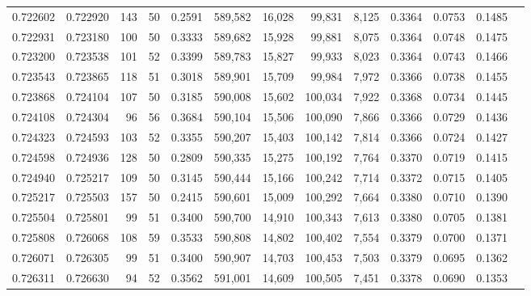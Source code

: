\begin{tabular}{rrrrrrrrrrrrr}
0.722602 & 0.722920 &   143 &  50 &                                     0.2591 & 589,582 &  16,028 &  99,831 &   8,125 & 0.3364 & 0.0753 & 0.1485 \\
0.722931 & 0.723180 &   100 &  50 &                                     0.3333 & 589,682 &  15,928 &  99,881 &   8,075 & 0.3364 & 0.0748 & 0.1475 \\
0.723200 & 0.723538 &   101 &  52 &                                     0.3399 & 589,783 &  15,827 &  99,933 &   8,023 & 0.3364 & 0.0743 & 0.1466 \\
0.723543 & 0.723865 &   118 &  51 &                                     0.3018 & 589,901 &  15,709 &  99,984 &   7,972 & 0.3366 & 0.0738 & 0.1455 \\
0.723868 & 0.724104 &   107 &  50 &                                     0.3185 & 590,008 &  15,602 & 100,034 &   7,922 & 0.3368 & 0.0734 & 0.1445 \\
0.724108 & 0.724304 &    96 &  56 &                                     0.3684 & 590,104 &  15,506 & 100,090 &   7,866 & 0.3366 & 0.0729 & 0.1436 \\
0.724323 & 0.724593 &   103 &  52 &                                     0.3355 & 590,207 &  15,403 & 100,142 &   7,814 & 0.3366 & 0.0724 & 0.1427 \\
0.724598 & 0.724936 &   128 &  50 &                                     0.2809 & 590,335 &  15,275 & 100,192 &   7,764 & 0.3370 & 0.0719 & 0.1415 \\
0.724940 & 0.725217 &   109 &  50 &                                     0.3145 & 590,444 &  15,166 & 100,242 &   7,714 & 0.3372 & 0.0715 & 0.1405 \\
0.725217 & 0.725503 &   157 &  50 &                                     0.2415 & 590,601 &  15,009 & 100,292 &   7,664 & 0.3380 & 0.0710 & 0.1390 \\
0.725504 & 0.725801 &    99 &  51 &                                     0.3400 & 590,700 &  14,910 & 100,343 &   7,613 & 0.3380 & 0.0705 & 0.1381 \\
0.725808 & 0.726068 &   108 &  59 &                                     0.3533 & 590,808 &  14,802 & 100,402 &   7,554 & 0.3379 & 0.0700 & 0.1371 \\
0.726071 & 0.726305 &    99 &  51 &                                     0.3400 & 590,907 &  14,703 & 100,453 &   7,503 & 0.3379 & 0.0695 & 0.1362 \\
0.726311 & 0.726630 &    94 &  52 &                                     0.3562 & 591,001 &  14,609 & 100,505 &   7,451 & 0.3378 & 0.0690 & 0.1353 \\

\end{tabular}
